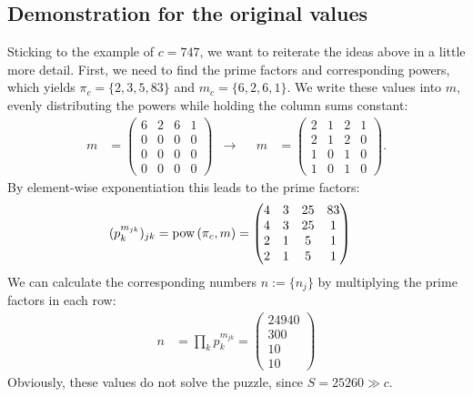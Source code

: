 \documentclass[english, parskip=full]{scrartcl}
\newcommand{\tecxt}{}
\begin{document}
\subsection{Demonstration for the original values}
Sticking to the example of $c=747$, we want to reiterate the ideas above in a little more detail. First, we need to find the prime factors and corresponding powers, which yields $\pi_c=\{2,3,5,83\}$ and $m_c=\{6,2,6,1\}$. We write these values into $m$, evenly distributing the powers while holding the column sums constant:
\begin{align*}
m&=\begin{pmatrix}
6&2&6&1 \\ 0&0&0&0 \\ 0&0&0&0 \\ 0&0&0&0
\end{pmatrix}&\longrightarrow &&m&=\begin{pmatrix}
2&1&2&1 \\ 2&1&2&0 \\ 1&0&1&0 \\ 1&0&1&0
\end{pmatrix}.
\end{align*}
By element-wise exponentiation this leads to the prime factors:
\begin{align*}
(p_k^{m_{jk}})_{jk}&=\tecxt\text{pow\,}(\pi_c, m)=\begin{pmatrix}
4&3&25&83 \\ 4&3&25&1 \\ 2&1&5&1 \\ 2&1&5&1
\end{pmatrix}
\end{align*}
We can calculate the corresponding numbers $n:=\{n_j\}$ by   multiplying the prime factors in each row:
\begin{align*}
n&=\prod_kp_k^{m_{jk}}=\begin{pmatrix}
24940 \\ 300 \\ 10 \\ 10
\end{pmatrix}
\end{align*}
Obviously, these values do not solve the puzzle, since $S=25260\gg c$.
\end{document}

